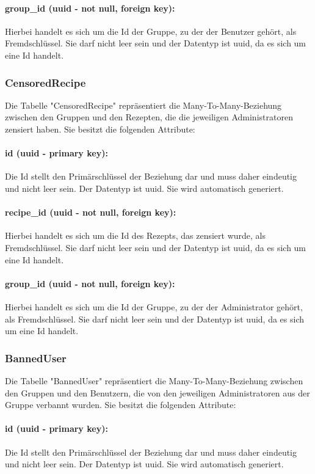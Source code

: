\documentclass[parskip=full]{scrartcl}
\begin{document}
\paragraph{group\_id (uuid - not null, foreign key):} Hierbei handelt es sich um die Id der Gruppe, zu der der Benutzer gehört, als Fremdschlüssel. Sie darf nicht leer sein und der Datentyp ist \Gls{uuid}, da es sich um eine Id handelt.
\newpage
\subsubsection{CensoredRecipe}
Die Tabelle "CensoredRecipe" repräsentiert die Many-To-Many-Beziehung zwischen den Gruppen und den Rezepten, die die jeweiligen Administratoren zensiert haben. Sie besitzt die folgenden Attribute:
\paragraph{id (uuid - primary key):} Die Id stellt den Primärschlüssel der Beziehung dar und muss daher eindeutig und nicht leer sein. Der Datentyp ist \Gls{uuid}. Sie wird automatisch generiert.
\paragraph{recipe\_id (uuid - not null, foreign key):} Hierbei handelt es sich um die Id des Rezepts, das zensiert wurde, als Fremdschlüssel. Sie darf nicht leer sein und der Datentyp ist \Gls{uuid}, da es sich um eine Id handelt.
\paragraph{group\_id (uuid - not null, foreign key):} Hierbei handelt es sich um die Id der Gruppe, zu der der Administrator gehört, als Fremdschlüssel. Sie darf nicht leer sein und der Datentyp ist \Gls{uuid}, da es sich um eine Id handelt.
\newpage

\subsubsection{BannedUser}
Die Tabelle "BannedUser" repräsentiert die Many-To-Many-Beziehung zwischen den Gruppen und den Benutzern, die von den jeweiligen Administratoren aus der Gruppe verbannt wurden. Sie besitzt die folgenden Attribute:
\paragraph{id (uuid - primary key):} Die Id stellt den Primärschlüssel der Beziehung dar und muss daher eindeutig und nicht leer sein. Der Datentyp ist \Gls{uuid}. Sie wird automatisch generiert.
\end{document}
